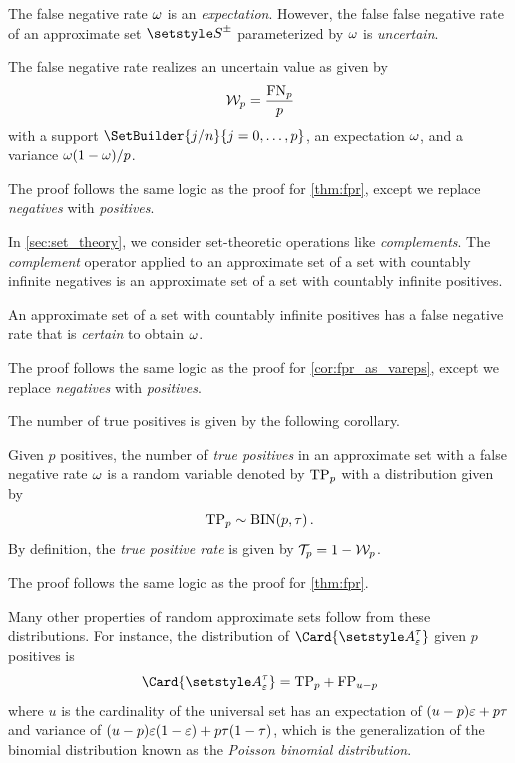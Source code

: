 \documentclass[10pt,final,hidelinks]{article}
\numberwithin{equation}{section}
\begin{document}
The false negative rate $\omega$ is an \emph{expectation}.
However, the false false negative rate of an approximate set $\ASet{S}$ parameterized by $\omega$ is \emph{uncertain}.
\begin{theorem}
\label{thm:fnr}
The false negative rate realizes an uncertain value as given by
\begin{equation}
    \mathcal{W}_p = \frac{\mathrm{FN}_p}{p}
\end{equation}
with a support $\SetBuilder{j / n}{j = 0,\ldots,p}$, an expectation 
$\omega$, 
and a variance $\omega(1-\omega) / p$.
\end{theorem}
The proof follows the same logic as the proof for \cref{thm:fpr}, except we 
replace \emph{negatives} with \emph{positives}.

In \cref{sec:set_theory}, we consider set-theoretic operations like 
\emph{complements}. The \emph{complement} operator applied to an approximate 
set 
of a set with countably infinite negatives is an approximate set of a set with 
countably infinite positives.
\begin{corollary}
An approximate set of a set with countably infinite positives has a false 
negative rate that is \emph{certain} to obtain $\omega$.
\end{corollary}
The proof follows the same logic as the proof for \cref{cor:fpr_as_vareps}, 
except we replace \emph{negatives} with \emph{positives}.

The number of true positives is given by the following corollary.
\begin{corollary}
\label{cor:tpbinom}
Given $p$ positives, the number of \emph{true positives} in an approximate set 
with a false negative rate $\omega$ is a random variable denoted by $\mathrm{TP}_p$
with a distribution given by 
\begin{equation}
    \mathrm{TP}_p \sim \mathrm{BIN}(p, \tau)\,.
\end{equation}
By definition, the \emph{true positive rate} is given by $\mathcal{T}_p = 1 - 
\mathcal{W}_p$.
\end{corollary}
The proof follows the same logic as the proof for \cref{thm:fpr}.

Many other properties of random approximate sets follow from these distributions.
For instance, the distribution of $\Card{\ASet{A}[\fprate][\tprate]}$ given $p$ positives is
\begin{equation}
	\Card{\ASet{A}[\fprate][\tprate]} = \TP_p + \FP_{u - p}
\end{equation}
where $u$ is the cardinality of the universal set has an expectation of $(u - p) \varepsilon + p \tau$ and variance of $(u - p) \varepsilon(1-\varepsilon) + p \tau(1-\tau)$, which is the generalization of the binomial distribution known as the \emph{Poisson binomial distribution}.
\end{document}
